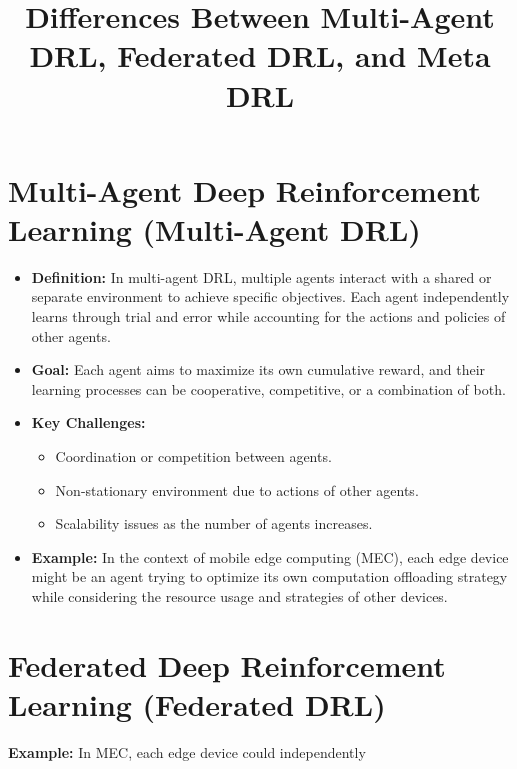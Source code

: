 \documentclass[12pt]{article}
\begin{document}
 \title{Differences Between Multi-Agent DRL, Federated DRL, and Meta DRL} \author{} \date{} \maketitle \section{Multi-Agent Deep Reinforcement Learning (Multi-Agent DRL)} \begin{itemize} \item \textbf{Definition:} In multi-agent DRL, multiple agents interact with a shared or separate environment to achieve specific objectives. Each agent independently learns through trial and error while accounting for the actions and policies of other agents. \item \textbf{Goal:} Each agent aims to maximize its own cumulative reward, and their learning processes can be cooperative, competitive, or a combination of both. \item \textbf{Key Challenges:} \begin{itemize} \item Coordination or competition between agents. \item Non-stationary environment due to actions of other agents. \item Scalability issues as the number of agents increases. \end{itemize} \item \textbf{Example:} In the context of mobile edge computing (MEC), each edge device might be an agent trying to optimize its own computation offloading strategy while considering the resource usage and strategies of other devices. \end{itemize} \section{Federated Deep Reinforcement Learning (Federated DRL)}  \item \textbf{Example:} In MEC, each edge device could independently 
\end{document}
